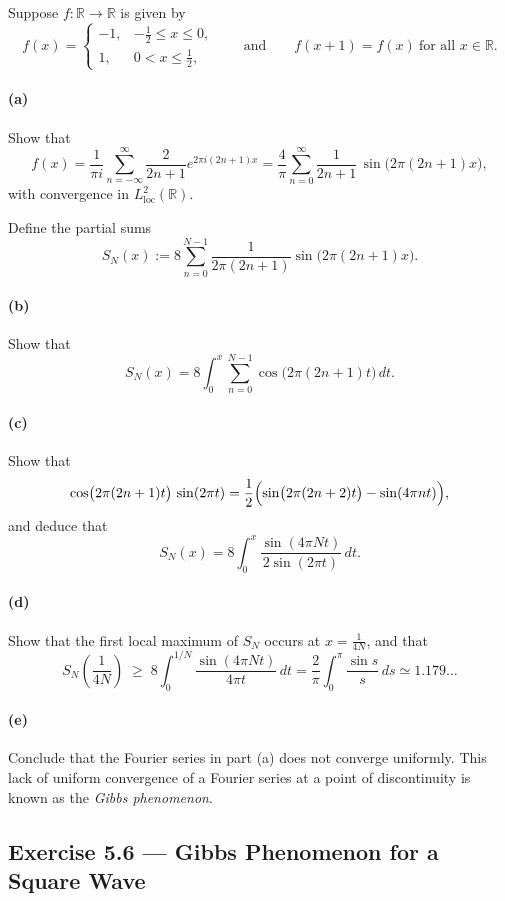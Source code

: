 \documentclass[12pt,a4paper]{article}
\theoremstyle{plain}
\theoremstyle{definition}
\theoremstyle{remark}
\theoremstyle{remark}
\begin{document}
Suppose $f:\mathbb{R}\to\mathbb{R}$ is given by
\[
f(x) =
\begin{cases}
	-1, & -\tfrac12 \le x \le 0,\\[0.3em]
	1, & 0 < x \le \tfrac12,
\end{cases}
\qquad\text{and}\qquad
f(x+1) = f(x)\ \text{for all }x\in\mathbb{R}.
\]

\paragraph{(a)}
Show that
\[
f(x)
= \frac{1}{\pi i}\sum_{n=-\infty}^{\infty}
\frac{2}{2n+1} e^{2\pi i (2n+1)x}
= \frac{4}{\pi}\sum_{n=0}^{\infty}
\frac{1}{2n+1}\,\sin\bigl(2\pi(2n+1)x\bigr),
\]
with convergence in $L^2_{\mathrm{loc}}(\mathbb{R})$.

Define the partial sums
\[
S_N(x)
:= 8 \sum_{n=0}^{N-1} \frac{1}{2\pi(2n+1)}
\sin\bigl(2\pi(2n+1)x\bigr).
\]

\paragraph{(b)}
Show that
\[
S_N(x)
= 8 \int_0^x \sum_{n=0}^{N-1}
\cos\bigl(2\pi(2n+1)t\bigr)\,dt.
\]

\paragraph{(c)}
Show that
\[
\cos\bigl(2\pi(2n+1)t\bigr)\,\sin(2\pi t)
= \frac12\Bigl(\sin\bigl(2\pi(2n+2)t\bigr)
- \sin(4\pi n t)\Bigr),
\]
and deduce that
\[
S_N(x)
= 8 \int_0^x
\frac{\sin(4\pi N t)}{2\sin(2\pi t)}\,dt.
\]

\paragraph{(d)}
Show that the first local maximum of $S_N$ occurs at
$x = \tfrac{1}{4N}$, and that
\[
S_N\!\left(\frac{1}{4N}\right)
\;\ge\;
8\int_0^{1/N} \frac{\sin(4\pi N t)}{4\pi t}\,dt
= \frac{2}{\pi}\int_0^{\pi} \frac{\sin s}{s}\,ds
\simeq 1.179\ldots
\]

\paragraph{(e)}
Conclude that the Fourier series in part (a) does not converge
uniformly.  This lack of uniform convergence of a Fourier series at a
point of discontinuity is known as the \emph{Gibbs phenomenon}.


\subsection*{Exercise 5.6 — Gibbs Phenomenon for a Square Wave}
\end{document}
